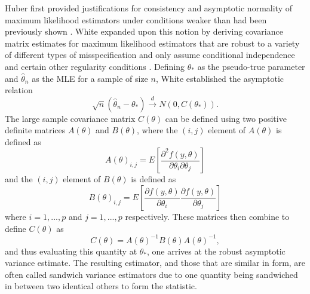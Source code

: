 \documentclass[submit]{smj}
\begin{document}
		Huber first provided justifications for consistency and asymptotic normality of maximum likelihood estimators under conditions weaker than had been previously shown \citet{Huber}. White
		expanded upon this notion by deriving covariance matrix estimates for maximum likelihood estimators that are robust to a variety of different types of misspecification and only assume
		conditional independence and certain other regularity conditions \citet{White1982}. Defining $\theta_*$ as the pseudo-true parameter and $\hat{\theta}_n$ as the MLE for a sample of size
		$n$, White established the asymptotic relation
		\begin{equation*}
			\sqrt{n} (\hat{\theta}_n - \theta_*) \xrightarrow[]{d} N(0, C(\theta_* ) ) .
		\end{equation*}
		The large sample covariance matrix $C(\theta)$ can be defined using two positive definite matrices $A(\theta)$ and $B(\theta)$, where the $(i,j)$ element of $A(\theta)$ is defined as
		\begin{equation*}
			A(\theta)_{i,j} = E \left[ \frac{\partial^2 f(y,\theta)}{\partial \theta_i \partial \theta_j} \right] 
		\end{equation*}
		and the $(i,j)$ element of $B(\theta)$ is defined as
		\begin{equation*}
			B(\theta)_{i,j} = E \left[ \frac{\partial f(y,\theta)}{\partial \theta_i} \frac{\partial f(y,\theta)}{\partial \theta_j} \right] 
		\end{equation*}
		where $i = 1,...,p$ and $j = 1,...,p$ respectively. These matrices then combine to define $C(\theta)$ as
		\begin{equation*}
			C(\theta) = A(\theta)^{-1} B(\theta) A(\theta)^{-1} ,
		\end{equation*}
		and thus evaluating this quantity at $\theta_*$, one arrives at the robust asymptotic variance estimate. The resulting estimator, and those that are similar in form, are often called sandwich
		variance estimators due to one quantity being sandwiched in between two identical others to form the statistic.
\end{document}
